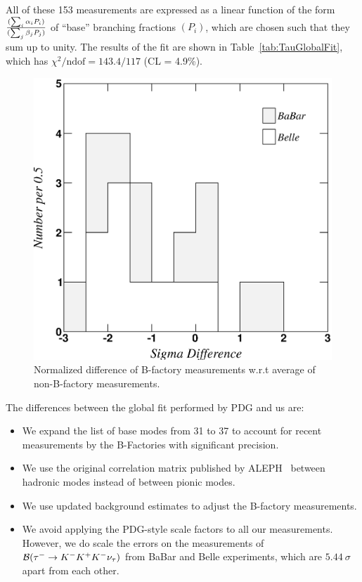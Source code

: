 \documentclass[fleqn,twoside]{article}
\begin{document}
All of these 153 measurements are expressed as a linear function
of the form $(\sum_i \alpha_i P_i )\over(\sum_j \beta_j P_j )$ 
of ``base'' branching fractions $(P_i)$, 
which are chosen such that they sum up to unity.
The results of the fit are shown in Table~\ref{tab:TauGlobalFit},
which has $\chi^2/\mathrm{ndof} = 143.4/117$ (CL = 4.9\%). 

\begin{figure}[!hbtp]
\begin{center}
\includegraphics[height=.4\textheight,width=.49\textwidth]{figures/compare_with_NoBB.eps}
\end{center}
\caption{Normalized difference of B-factory measurements w.r.t average of non-B-factory measurements.}
\label{fig:comp_NoBB}
\end{figure}
 
The differences between the global fit performed by PDG and us are:
\begin{itemize}
\item We expand the list of base modes from 31 to 37 to account for recent
  measurements by the B-Factories with significant precision.
\item We use the original correlation matrix published by
 ALEPH~\cite{Schael:2005am} between hadronic modes instead of between
 pionic modes.
\item We use updated background estimates to adjust the B-factory measurements.
\item We avoid applying the PDG-style scale factors to all our measurements.
However, we do scale the errors on the measurements of ${\cal{B}}({\tau^- \to K^-K^+K^-\nu_\tau})$
from BaBar and Belle experiments, which are $5.44~\sigma$ apart from
each other.
\end{itemize}
\end{document}
